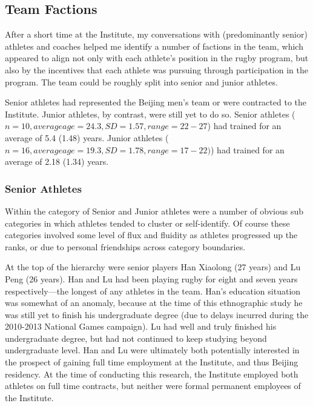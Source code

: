 \begin{CJK}{UTF8}{gbsn}
\subsection{Team Factions\label{sect:teamFactions}}

After a short time at the Institute, my conversations with (predominantly senior) athletes and coaches helped me identify a number of factions in the team, which appeared to align not only with each athlete's position in the rugby program, but also by the incentives that each athlete was pursuing through participation in the program. The team could be roughly split into senior and junior athletes.

Senior athletes had represented the Beijing men's team or were contracted to the Institute. Junior athletes, by contrast, were still yet to do so.  Senior athletes  ($n = 10, average age = 24.3, SD = 1.57, range = 22 - 27$) had trained for an average of 5.4 (1.48) years.  Junior athletes ($n = 16, average age = 19.3, SD = 1.78, range = 17 - 22)$) had trained for an average of 2.18 (1.34) years.


\subsubsection{Senior Athletes}

Within the category of Senior and Junior athletes were a number of obvious sub categories in which athletes tended to cluster or self-identify.  Of course these categories involved some level of flux and fluidity as athletes progressed up the ranks, or due to personal friendships across category boundaries.

At the top of the hierarchy were senior players Han Xiaolong (27 years) and Lu Peng (26 years). Han and Lu had been playing rugby for eight and seven years respectively---the longest of any athletes in the team.  Han's education situation was somewhat of an anomaly, because at the time of this ethnographic study he was still yet to finish his undergraduate degree (due to delays incurred during the 2010-2013 National Games campaign). Lu had well and truly finished his undergraduate degree, but had not continued to keep studying beyond undergraduate level. Han and Lu were ultimately both potentially interested in the prospect of gaining full time employment at the Institute, and thus Beijing residency.  At the time of conducting this research, the Institute employed both athletes on full time contracts, but neither were formal permanent employees of the Institute.


\end{CJK}
